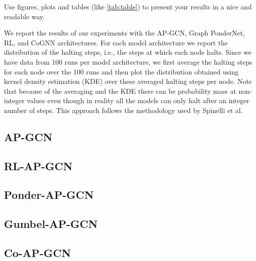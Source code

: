 \documentclass{gdl}
\begin{document}
Use figures, plots and tables (like \autoref{tab:table}) to present your results in a nice and readable way.

We report the results of our experiments with the AP-GCN, Graph PonderNet, RL, and CoGNN architectures. For each model architecture we report the distribution of the halting steps, i.e., the steps at which each node halts. Since we have data from 100 runs per model architecture, we first average the halting steps for each node over the 100 runs and then plot the distribution obtained using kernel density estimation (KDE) over these averaged halting steps per node. Note that because of the averaging and the KDE there can be probability mass at non-integer values even though in reality all the models can only halt after an integer number of steps. This approach follows the methodology used by Spinelli et al.


\subsection{AP-GCN}

\subsection{RL-AP-GCN}

\subsection{Ponder-AP-GCN}

\subsection{Gumbel-AP-GCN}

\subsection{Co-AP-GCN}
\end{document}
